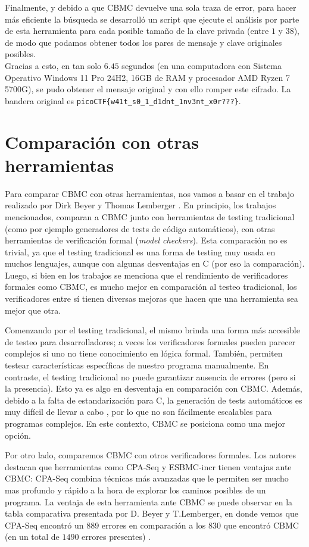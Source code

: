 \documentclass[runningheads]{llncs}
\begin{document}
Finalmente, y debido a que CBMC devuelve una sola traza de error, para hacer más eficiente la búsqueda se desarrolló un script que ejecute el análisis por parte de esta herramienta para cada posible tamaño de la clave privada (entre $1$ y $38$), de modo que podamos obtener todos los pares de mensaje y clave originales posibles.\\
Gracias a esto, en tan solo $6.45$ segundos (en una computadora con Sistema Operativo Windows 11 Pro 24H2, 16GB de RAM y procesador AMD Ryzen 7 5700G), se pudo obtener el mensaje original y con ello romper este cifrado.
La bandera original es \verb|picoCTF{w41t_s0_1_d1dnt_1nv3nt_x0r???}|.

\section{Comparación con otras herramientas}
Para comparar CBMC con otras herramientas, nos vamos a basar en el trabajo realizado por Dirk Beyer y Thomas Lemberger \cite{cbmc-comparison}.
En principio, los trabajos mencionados, comparan a CBMC junto con herramientas de testing tradicional (como por ejemplo generadores de tests de código automáticos), con otras herramientas de verificación formal (\textit{model checkers}).
Esta comparación no es trivial, ya que el testing tradicional es una forma de testing muy usada en muchos lenguajes, aunque con algunas desventajas en C (por eso la comparación).
Luego, si bien en los trabajos se menciona que el rendimiento de verificadores formales como CBMC, es mucho mejor en comparación al testeo tradicional, los verificadores entre sí tienen diversas mejoras que hacen que una herramienta sea mejor que otra.

Comenzando por el testing tradicional, el mismo brinda una forma más accesible de testeo para desarrolladores; a veces los verificadores formales pueden parecer complejos si uno no tiene conocimiento en lógica formal.
También, permiten testear características específicas de nuestro programa manualmente. En contraste, el testing tradicional no puede garantizar ausencia de errores (pero si la presencia).
Esto ya es algo en desventaja en comparación con CBMC. Además, debido a la falta de estandarización para C, la generación de tests automáticos es muy difícil de llevar a cabo \cite{cbmc-comparison}, por lo que no son fácilmente escalables para programas complejos.
En este contexto, CBMC se posiciona como una mejor opción.

Por otro lado, comparemos CBMC con otros verificadores formales. Los autores destacan que herramientas como CPA-Seq y ESBMC-incr tienen ventajas ante CBMC: CPA-Seq combina técnicas más avanzadas que le permiten ser mucho mas profundo y rápido a la hora de explorar los caminos posibles de un programa.
La ventaja de esta herramienta ante CBMC se puede observar en la tabla comparativa presentada por D. Beyer y T.Lemberger, en donde vemos que CPA-Seq encontró un 889 errores en comparación a los 830 que encontró CBMC (en un total de $1490$ errores presentes) \cite{cbmc-comparison}.
\end{document}
